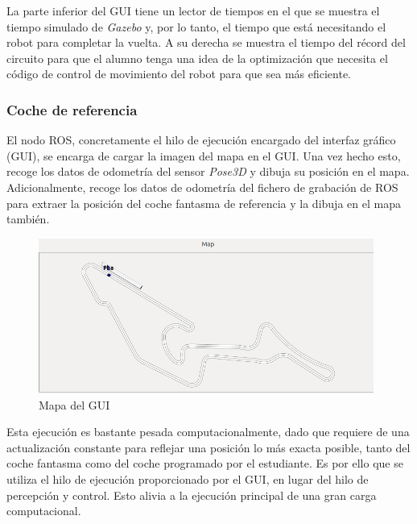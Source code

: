 La parte inferior del GUI tiene un lector de tiempos en el que se muestra el tiempo simulado de \textit{Gazebo} y, por lo tanto, el tiempo que está necesitando el robot para completar la vuelta. A su derecha se muestra el tiempo del récord del circuito para que el alumno tenga una idea de la optimización que necesita el código de control de movimiento del robot para que sea más eficiente.

\subsubsection{Coche de referencia}
El nodo ROS, concretamente el hilo de ejecución encargado del interfaz gráfico (GUI), se encarga de cargar la imagen del mapa en el GUI. Una vez hecho esto, recoge los datos de odometría del sensor \textit{Pose3D} y dibuja su posición en el mapa. Adicionalmente, recoge los datos de odometría del fichero de grabación de ROS para extraer la posición del coche fantasma de referencia y la dibuja en el mapa también.

\begin{figure}[H]
  \begin{center}
    \includegraphics[width=0.98\textwidth]{figures/mapa_chrono.png}
		\caption{Mapa del GUI}
		\label{fig.mapach}
		\end{center}
\end{figure}

Esta ejecución es bastante pesada computacionalmente, dado que requiere de una actualización constante para reflejar una posición lo más exacta posible, tanto del coche fantasma como del coche programado por el estudiante. Es por ello que se utiliza el hilo de ejecución proporcionado por el GUI, en lugar del hilo de percepción y control. Esto alivia a la ejecución principal de una gran carga computacional.

